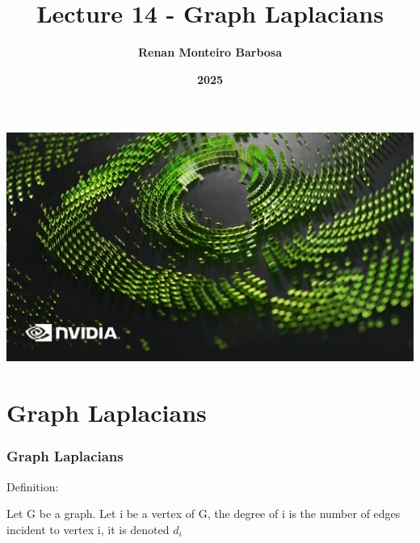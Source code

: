 \documentclass{beamer}
\begin{document}
{
{
    \includegraphics[width=\paperwidth,height=\paperheight]{images/Screenshot_9-12-2024_212019_.jpeg}
}
\title{\textbf{Lecture 14 - Graph Laplacians}}
\author[]{\textbf{Renan Monteiro Barbosa}}
\date[]{\textbf{2025}}
\maketitle
}


\section{Graph Laplacians}
\begin{frame}
\frametitle{\textbf{Graph Laplacians} }
Definition: \vspace{0.5 cm}

Let G be a graph. Let i be a vertex of G, the degree of i is the number of edges incident to vertex i, it is denoted $d_{i}$



\end{frame}
\end{document}
